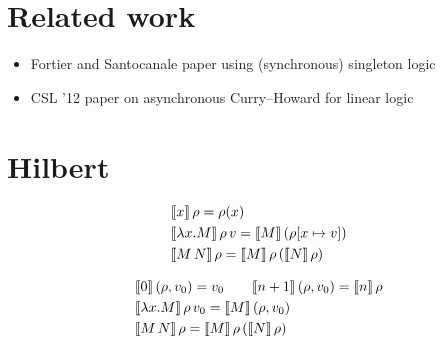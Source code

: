 


\section{Related work}\label{sec:singleton-logic:related-work}

\begin{itemize}
\item Fortier and Santocanale paper using (synchronous) singleton logic
\item CSL '12 paper on asynchronous Curry--Howard for linear logic
\end{itemize}


\section{Hilbert}


\begin{equation*}
  \begin{lgathered}
    \sem{x}\,\rho = \rho(x) \\
    \sem{\lambda x.M}\,\rho\,v = \sem{M}\,(\rho[x \mapsto v]) \\
    \sem{M\,N}\,\rho = \sem{M}\,\rho\,(\sem{N}\,\rho)
  \end{lgathered}
\end{equation*}

\begin{equation*}
  \begin{lgathered}
    \sem{0}\,(\rho, v_0) = v_0 \qquad \sem{n+1}\,(\rho, v_0) = \sem{n}\,\rho \\
    \sem{\lambda x.M}\,\rho\,v_0 = \sem{M}\,(\rho, v_0) \\
    \sem{M\,N}\,\rho = \sem{M}\,\rho\,(\sem{N}\,\rho)
  \end{lgathered}
\end{equation*}

